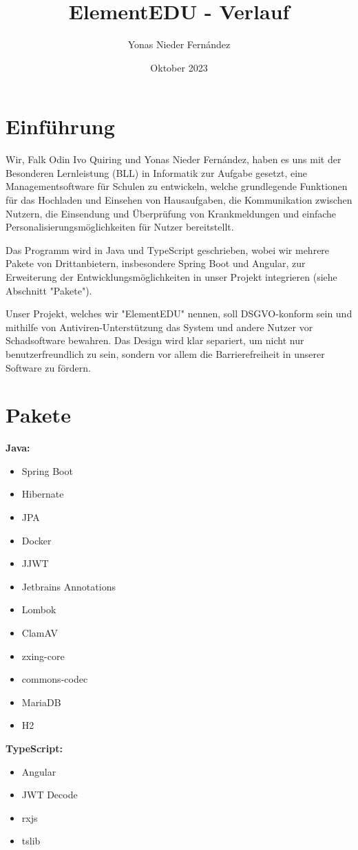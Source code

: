 \documentclass{article}
\title{ElementEDU - Verlauf}
\author{Yonas Nieder Fernández}
\date{Oktober 2023}
\begin{document}
\maketitle

\section{Einführung}

Wir, Falk Odin Ivo Quiring und Yonas Nieder Fernández, haben es uns mit der Besonderen Lernleistung (BLL) in Informatik zur Aufgabe gesetzt, eine Managementsoftware für Schulen zu entwickeln, welche grundlegende Funktionen für das Hochladen und Einsehen von Hausaufgaben, die Kommunikation zwischen Nutzern, die Einsendung und Überprüfung von Krankmeldungen und einfache Personalisierungsmöglichkeiten für Nutzer bereitstellt.

Das Programm wird in Java und TypeScript geschrieben, wobei wir mehrere Pakete von Drittanbietern, insbesondere Spring Boot und Angular, zur Erweiterung der Entwicklungsmöglichkeiten in unser Projekt integrieren (siehe Abschnitt "Pakete"). 

Unser Projekt, welches wir "ElementEDU" nennen, soll DSGVO-konform sein und mithilfe von Antiviren-Unterstützung das System und andere Nutzer vor Schadsoftware bewahren. Das Design wird klar separiert, um nicht nur benutzerfreundlich zu sein, sondern vor allem die Barrierefreiheit in unserer Software zu fördern. 

\section{Pakete}
\textbf{Java:}
\begin{itemize}
\item Spring Boot
\item Hibernate
\item JPA
\item Docker
\item JJWT
\item Jetbrains Annotations
\item Lombok
\item ClamAV
\item zxing-core
\item commons-codec
\item MariaDB
\item H2
\end{itemize}
\textbf{TypeScript:}
\begin{itemize}
    \item Angular
    \item JWT Decode
    \item rxjs
    \item tslib


\end{itemize}
\end{document}
